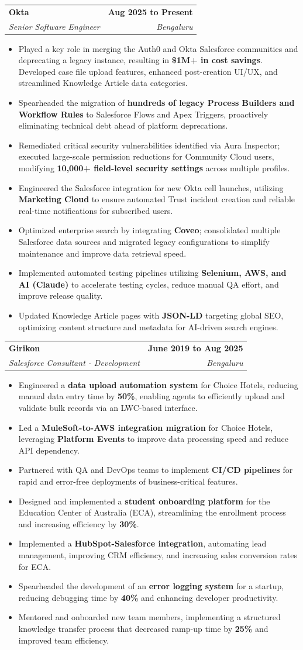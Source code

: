 \documentclass[letterpaper,11pt]{article}
\makeatletter
\newcommand{\resumeItem}[1]{
  \item\small{
    {#1 \vspace{-2pt}}
  }
}
\newcommand{\resumeSubheading}[4]{
  \vspace{-2pt}\item
    \begin{tabular*}{1.0\textwidth}[t]{l@{\extracolsep{\fill}}r}
      \textbf{#1} & \textbf{\small #2} \\
      \textit{\small#3} & \textit{\small #4} \\
    \end{tabular*}\vspace{-7pt}
}
\newcommand{\resumeItemListStart}{\begin{itemize}}
\newcommand{\resumeItemListEnd}{\end{itemize}\vspace{-5pt}}
\makeatother
\begin{document}
    \resumeSubheading
      {Okta}{Aug 2025 to Present}
      {Senior Software Engineer}{Bengaluru}
      \resumeItemListStart
        \resumeItem{Played a key role in merging the Auth0 and Okta Salesforce communities and deprecating a legacy instance, resulting in \textbf{\$1M+ in cost savings}. Developed case file upload features, enhanced post-creation UI/UX, and streamlined Knowledge Article data categories.}
        \resumeItem{Spearheaded the migration of \textbf{hundreds of legacy Process Builders and Workflow Rules} to Salesforce Flows and Apex Triggers, proactively eliminating technical debt ahead of platform deprecations.}
        \resumeItem{Remediated critical security vulnerabilities identified via Aura Inspector; executed large-scale permission reductions for Community Cloud users, modifying \textbf{10,000+ field-level security settings} across multiple profiles.}
        \resumeItem{Engineered the Salesforce integration for new Okta cell launches, utilizing \textbf{Marketing Cloud} to ensure automated Trust incident creation and reliable real-time notifications for subscribed users.}
        \resumeItem{Optimized enterprise search by integrating \textbf{Coveo}; consolidated multiple Salesforce data sources and migrated legacy configurations to simplify maintenance and improve data retrieval speed.}
        \resumeItem{Implemented automated testing pipelines utilizing \textbf{Selenium, AWS, and AI (Claude)} to accelerate testing cycles, reduce manual QA effort, and improve release quality.}
        \resumeItem{Updated Knowledge Article pages with \textbf{JSON-LD} targeting global SEO, optimizing content structure and metadata for AI-driven search engines.}
      \resumeItemListEnd

    \resumeSubheading
      {Girikon}{June 2019 to Aug 2025}
      {Salesforce Consultant - Development}{Bengaluru}
      \resumeItemListStart
        \resumeItem{Engineered a \textbf{data upload automation system} for Choice Hotels, reducing manual data entry time by \textbf{50\%}, enabling agents to efficiently upload and validate bulk records via an LWC-based interface.}
        \resumeItem{Led a \textbf{MuleSoft-to-AWS integration migration} for Choice Hotels, leveraging \textbf{Platform Events} to improve data processing speed and reduce API dependency.}
        \resumeItem{Partnered with QA and DevOps teams to implement \textbf{CI/CD pipelines} for rapid and error-free deployments of business-critical features.}
        \resumeItem{Designed and implemented a \textbf{student onboarding platform} for the Education Center of Australia (ECA), streamlining the enrollment process and increasing efficiency by \textbf{30\%}.}
        \resumeItem{Implemented a \textbf{HubSpot-Salesforce integration}, automating lead management, improving CRM efficiency, and increasing sales conversion rates for ECA.}
        \resumeItem{Spearheaded the development of an \textbf{error logging system} for a startup, reducing debugging time by \textbf{40\%} and enhancing developer productivity.}
        \resumeItem{Mentored and onboarded new team members, implementing a structured knowledge transfer process that decreased ramp-up time by \textbf{25\%} and improved team efficiency.}
      \resumeItemListEnd
\end{document}

